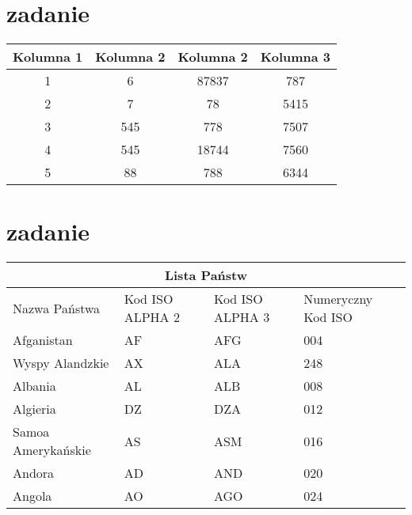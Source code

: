 \documentclass[12pt,a4paper]{article}
\begin{document}
\begin{center}
\begin{longtable}{|c|c|}
		\end{longtable}
		\vspace{1cm}
		\section{zadanie}
			\begin{tabular}{||c c c c ||}
				\hline
				Kolumna 1 & Kolumna 2 & Kolumna 2 & Kolumna 3\\
				\hline
				\hline
				1 & 6 & 87837 &  787\\
				2 & 7 & 78 & 5415\\
				3 & 545 & 778 & 7507\\
				4 & 545 & 18744 & 7560\\
				5 & 88 & 788 & 6344\\
				\hline
			\end{tabular}
		\vspace{2cm}
		\section{zadanie}
		\setlength{\arrayrulewidth}{1mm}
		\setlength{\tabcolsep}{10pt}
		\renewcommand{\arraystretch}{1.5}
		\begin{tabular}{|p{4cm}||p{2cm}|p{2cm}|p{2cm}|}
			\hline
			\multicolumn{4}{|c|}{Lista Państw}\\
			\hline
			Nazwa Państwa & Kod ISO ALPHA 2 & Kod ISO ALPHA 3 & Numeryczny Kod ISO\\
			\hline
			Afganistan & AF & AFG & 004\\
			Wyspy Alandzkie & AX & ALA & 248\\
			Albania & AL & ALB & 008\\
			Algieria & DZ & DZA & 012\\
			Samoa Amerykańskie  & AS & ASM & 016\\
			Andora & AD & AND & 020\\
			Angola & AO & AGO & 024\\
			\hline
		\end{tabular}
	\vspace{1cm}

\end{center}
\end{document}
